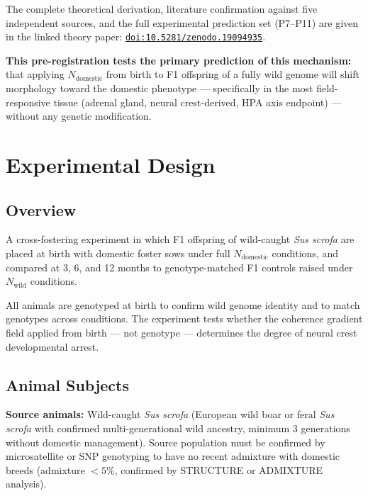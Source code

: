 \documentclass[10pt, a4paper]{article}
\begin{document}
The complete theoretical derivation, literature
confirmation against five independent sources,
and the full experimental prediction set (P7--P11)
are given in the linked theory paper:
\href{https://doi.org/10.5281/zenodo.19094935}
{\texttt{doi:10.5281/zenodo.19094935}}.

\textbf{This pre-registration tests the primary
prediction of this mechanism:} that applying
$N_{\text{domestic}}$ from birth to F1 offspring
of a fully wild genome will shift morphology toward
the domestic phenotype --- specifically in the
most field-responsive tissue (adrenal gland,
neural crest-derived, HPA axis endpoint) ---
without any genetic modification.

\section{Experimental Design}
\label{sec:design}

\subsection{Overview}

A cross-fostering experiment in which F1 offspring
of wild-caught \textit{Sus scrofa} are placed at
birth with domestic foster sows under full
$N_{\text{domestic}}$ conditions, and compared at
3, 6, and 12 months to genotype-matched F1 controls
raised under $N_{\text{wild}}$ conditions.

All animals are genotyped at birth to confirm wild
genome identity and to match genotypes across
conditions. The experiment tests whether the
coherence gradient field applied from birth ---
not genotype --- determines the degree of neural
crest developmental arrest.

\subsection{Animal Subjects}

\textbf{Source animals:}
Wild-caught \textit{Sus scrofa} (European wild boar
or feral \textit{Sus scrofa} with confirmed
multi-generational wild ancestry, minimum 3
generations without domestic management).
Source population must be confirmed by microsatellite
or SNP genotyping to have no recent admixture with
domestic breeds (admixture $< 5\%$, confirmed by
STRUCTURE or ADMIXTURE analysis).
\end{document}
